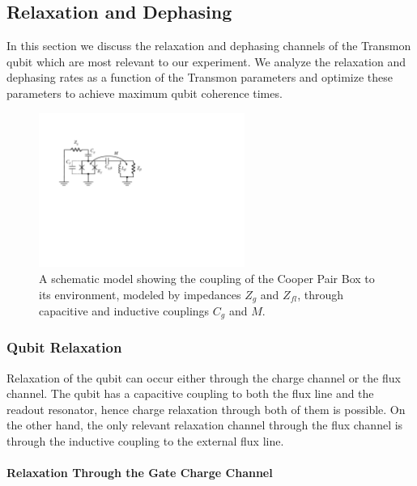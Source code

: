 \subsection{Relaxation and Dephasing}

In this section we discuss the relaxation and dephasing channels of the Transmon qubit which are most relevant to our experiment. We analyze the relaxation and dephasing rates as a function of the Transmon parameters and optimize these parameters to achieve maximum qubit coherence times.

\begin{figure}
	\centering
	\includegraphics[width=0.6\textwidth]{./material/figures/introduction/cooper_pair_box_decoherence}
	\caption[]{A schematic model showing the coupling of the Cooper Pair Box to its environment, modeled by impedances $Z_g$ and $Z_{fl}$, through capacitive and inductive couplings $C_g$ and $M$.}
	\label{fig:cooper_pair_box_decoherence}
\end{figure}

\subsubsection{Qubit Relaxation}

Relaxation of the qubit can occur either through the charge channel or the flux channel. The qubit has a capacitive coupling to both the flux line and the readout resonator, hence charge relaxation through both of them is possible. On the other hand, the only relevant relaxation channel through the flux channel is through the inductive coupling to the external flux line.

\paragraph{Relaxation Through the Gate Charge Channel}

